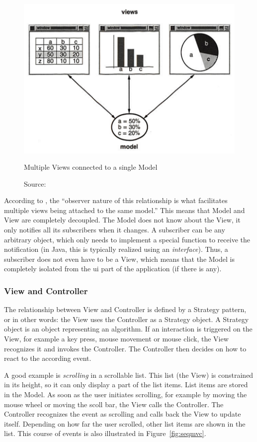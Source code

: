 \begin{figure}[H]
	\centering
	\includegraphics[width=12cm]{images/modelviewhd.png}
	\caption{Multiple Views connected to a single Model}
	\caption*{Source: }
	\label{fig:modelview}
\end{figure}

According to , the ``observer nature of this relationship is what facilitates multiple views being attached to the same model.'' This means that Model and View are completely decoupled. The Model does not know about the View, it only notifies all its subscribers when it changes. A subscriber can be any arbitrary object, which only needs to implement a special function to receive the notification (in Java, this is typically realized using an \emph{interface}). Thus, a subscriber does not even have to be a View, which means that the Model is completely isolated from the \ac{ui} part of the application (if there is any).

\subsubsection{View and Controller}
The relationship between View and Controller is defined by a Strategy pattern, or in other words: the View uses the Controller as a Strategy object. A Strategy object is an object representing an algorithm. If an interaction is triggered on the View, for example a key press, mouse movement or mouse click, the View recognizes it and invokes the Controller. The Controller then decides on how to react to the according event.

A good example is \emph{scrolling} in a scrollable list. This list (the View) is constrained in its height, so it can only display a part of the list items. List items are stored in the Model. As soon as the user initiates scrolling, for example by moving the mouse wheel or moving the scoll bar, the View calls the Controller. The Controller recognizes the event as scrolling and calls back the View to update itself. Depending on how far the user scrolled, other list items are shown in the list. This course of events is also illustrated in Figure~\ref{fig:seqmvc}.

